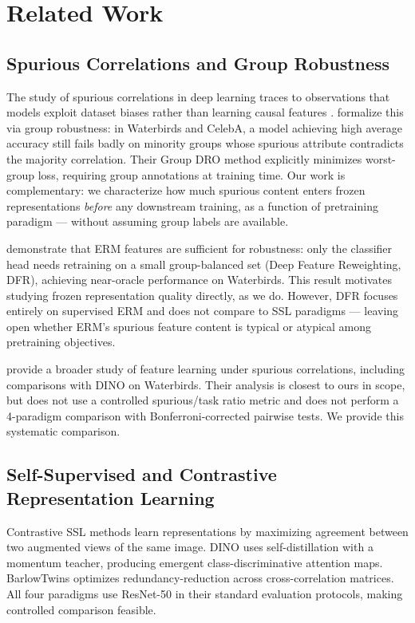 \section{Related Work}
\label{sec:related}

\subsection{Spurious Correlations and Group Robustness}

The study of spurious correlations in deep learning traces to observations that models exploit dataset biases rather than learning causal features \citep{Geirhos2020Shortcut, Zhang2017Rethinking}. \citet{Sagawa2020GroupDRO} formalize this via group robustness: in Waterbirds and CelebA, a model achieving high average accuracy still fails badly on minority groups whose spurious attribute contradicts the majority correlation. Their Group DRO method explicitly minimizes worst-group loss, requiring group annotations at training time. Our work is complementary: we characterize how much spurious content enters frozen representations \textit{before} any downstream training, as a function of pretraining paradigm --- without assuming group labels are available.

\citet{Kirichenko2022DFR} demonstrate that ERM features are sufficient for robustness: only the classifier head needs retraining on a small group-balanced set (Deep Feature Reweighting, DFR), achieving near-oracle performance on Waterbirds. This result motivates studying frozen representation quality directly, as we do. However, DFR focuses entirely on supervised ERM and does not compare to SSL paradigms --- leaving open whether ERM's spurious feature content is typical or atypical among pretraining objectives.

\citet{Izmailov2022Feature} provide a broader study of feature learning under spurious correlations, including comparisons with DINO on Waterbirds. Their analysis is closest to ours in scope, but does not use a controlled spurious/task ratio metric and does not perform a 4-paradigm comparison with Bonferroni-corrected pairwise tests. We provide this systematic comparison.

\subsection{Self-Supervised and Contrastive Representation Learning}

Contrastive SSL methods \citep{Chen2020SimCLR, He2020MoCo} learn representations by maximizing agreement between two augmented views of the same image. DINO \citep{Caron2021DINO} uses self-distillation with a momentum teacher, producing emergent class-discriminative attention maps. BarlowTwins \citep{Zbontar2021BarlowTwins} optimizes redundancy-reduction across cross-correlation matrices. All four paradigms use ResNet-50 in their standard evaluation protocols, making controlled comparison feasible.

